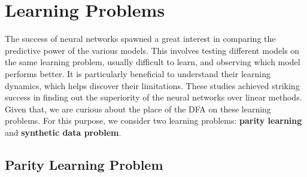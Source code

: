 \documentclass[a4paper, nobind]{templates/ociamthesis}
\begin{document}
\hypertarget{chap:chapter_2}{%
\chapter{Learning Problems}\label{chap:chapter_2}}

\minitoc 

\noindent The success of neural networks spawned a great interest in comparing the predictive power of the various models. This involves testing different models on the same learning problem, usually difficult to learn, and observing which model performs better. It is particularly beneficial to understand their learning dynamics, which helps discover their limitations. These studies achieved striking success in finding out the superiority of the neural networks over linear methods. Given that, we are curious about the place of the DFA on these learning problems. For this purpose, we consider two learning problems: \textbf{parity learning} and \textbf{synthetic data problem}.

\hypertarget{parity-learning-problem}{%
\section{Parity Learning Problem}\label{parity-learning-problem}}
\end{document}
